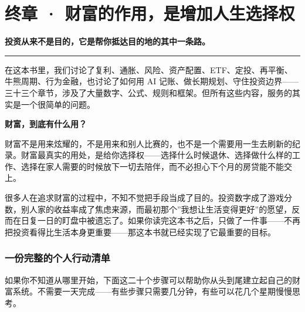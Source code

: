 \documentclass[a4paper,11pt,oneside,fontset=none,UTF8,zihao=-4]{ctexbook}
\begin{document}
\chapter{终章 ·
财富的作用，是增加人生选择权}\label{ux7ec8ux7ae0-ux8d22ux5bccux7684ux4f5cux7528ux662fux589eux52a0ux4ebaux751fux9009ux62e9ux6743}

\begin{dhquote}
\textbf{投资从来不是目的，它是帮你抵达目的地的其中一条路。}
\end{dhquote}

\begin{center}{\color{dh-bronze}\rule{0.2\textwidth}{0.5pt}}\end{center}

在这本书里，我们讨论了复利、通胀、风险、资产配置、ETF、定投、再平衡、牛熊周期、行为金融，也讨论了如何用
AI
记账、做长期规划、守住投资边界------三十三个章节，涉及了大量数字、公式、规则和框架。但所有这些内容，服务的其实是一个很简单的问题。

\textbf{财富，到底有什么用？}

财富不是用来炫耀的，不是用来和别人比赛的，也不是一个需要用一生去刷新的纪录。财富最真实的用处，是给你选择权------选择什么时候退休、选择做什么样的工作、选择在家人需要的时候放下一切去陪伴，而不必担心下个月的房贷能不能交上。

很多人在追求财富的过程中，不知不觉把手段当成了目的。投资数字成了游戏分数，别人家的收益率成了焦虑来源，而最初那个''我想让生活变得更好''的愿望，反而在日复一日的盯盘中被遗忘了。如果你读完这本书之后，只做了一件事------不再把投资看得比生活本身更重要------那这本书就已经实现了它最重要的目标。

\subsection{一份完整的个人行动清单}\label{ux4e00ux4efdux5b8cux6574ux7684ux4e2aux4ebaux884cux52a8ux6e05ux5355}

如果你不知道从哪里开始，下面这二十个步骤可以帮助你从头到尾建立起自己的财富系统。不需要一天完成------有些步骤只需要几分钟，有些可以花几个星期慢慢思考。
\end{document}
